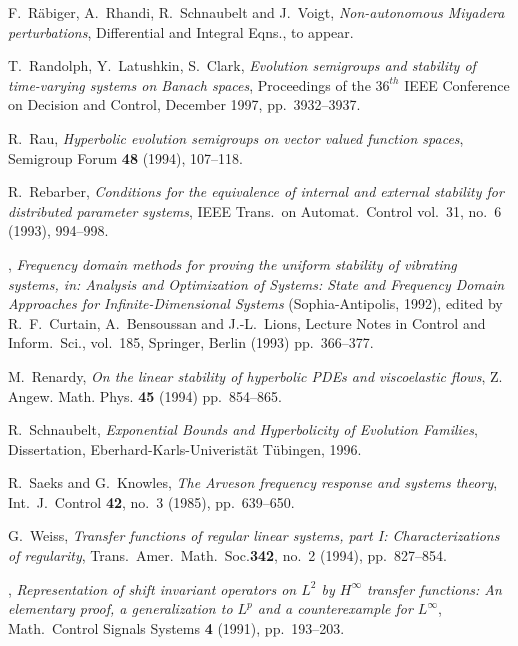 \documentclass[10pt,psamsfonts,leqno]{siamltex}
\begin{document}
\begin{thebibliography}{99}
 {\sc F.~R\"{a}biger, A.~Rhandi, R.~Schnaubelt and
J.~Voigt}, {\em Non-autonomous Miyadera perturbations},
Differential and Integral Eqns., to appear.

 {\sc T.~Randolph, Y.~Latushkin, S.~Clark},
 {\em Evolution semigroups and stability of time-varying
systems on Banach spaces}, Proceedings of the $36^{th}$
IEEE Conference on Decision and Control, December 1997, pp.~3932--3937.

 {\sc R.~Rau}, {\em Hyperbolic evolution semigroups on
vector valued function spaces}, Semigroup Forum {\bf 48} (1994),
107--118.

  {\sc R.~Rebarber}, {\em Conditions for the
 equivalence of internal and external stability for distributed
parameter
systems},
IEEE Trans.~on Automat.~Control vol.~31, no.~6 (1993), 994--998.

  \sameauthor,
{\em  Frequency domain methods
for proving the uniform stability of vibrating systems,
in:  Analysis and Optimization of Systems{\rm :} State and
Frequency Domain Approaches for Infinite-Dimensional
Systems} (Sophia-Antipolis, 1992), edited by
R.~F.~Curtain, A.~Bensoussan and J.-L.~Lions, Lecture
Notes in Control and Inform.~Sci., vol.~185, Springer,
Berlin (1993) pp.~366--377.

 {\sc M.~Renardy}, {\em On the linear
stability of hyperbolic PDEs and viscoelastic flows},
 Z. Angew. Math. Phys. {\bf 45} (1994) pp.~854--865.

 {\sc R.~Schnaubelt}, {\em Exponential Bounds and
Hyperbolicity of Evolution Families}, Dissertation,
Eberhard-Karls-Univerist\"at T\"ubingen, 1996.

 {\sc R.~Saeks and G.~Knowles}, {\em The Arveson frequency
response and systems theory},  Int.~J.~Control {\bf 42}, no.~3 (1985),
 pp.~639--650.

 {\sc G.~Weiss}, {\em Transfer functions of regular
 linear systems, part I{\rm:} Characterizations of regularity},
Trans.~Amer.~Math.~Soc.{\bf 342}, no.~2 (1994), pp.~827--854.

 \sameauthor, {\em
Representation of shift invariant
operators
on $L^2$ by $H^\infty$ transfer functions{\rm:} An elementary proof, a
generalization to $L^p$ and a counterexample for $L^\infty$},
 Math.~Control Signals Systems {\bf 4} (1991), pp.~193--203.

\end{thebibliography}
\end{document}
